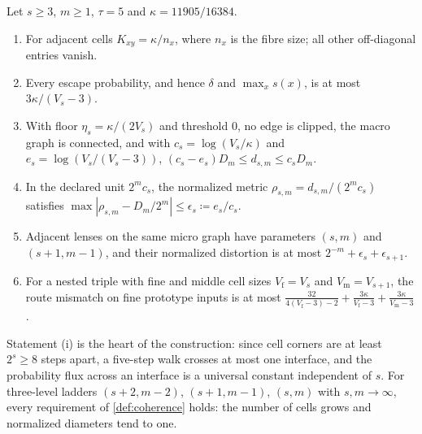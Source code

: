 \begin{theorem}
\label{thm:gasket}
Let $s\ge3$, $m\ge1$, $\tau=5$ and $\kappa=11905/16384$.
\begin{enumerate}[label=(\roman*)]
\item For adjacent cells $K_{xy}=\kappa/n_x$, where $n_x$ is the fibre size; all other off-diagonal entries vanish.
\item Every escape probability, and hence $\delta$ and $\max_x s(x)$, is at most $3\kappa/(V_s-3)$.
\item With floor $\eta_s=\kappa/(2V_s)$ and threshold $0$, no edge is clipped, the macro graph is connected, and with $c_s=\log(V_s/\kappa)$ and $e_s=\log(V_s/(V_s-3))$,
$(c_s-e_s)D_m\le d_{s,m}\le c_sD_m$.
\item In the declared unit $2^mc_s$, the normalized metric $\rho_{s,m}=d_{s,m}/(2^mc_s)$ satisfies $\max|\rho_{s,m}-D_m/2^m|\le\epsilon_s\coloneqq e_s/c_s$.
\item Adjacent lenses on the same micro graph have parameters $(s,m)$ and $(s+1,m-1)$, and their normalized distortion is at most $2^{-m}+\epsilon_s+\epsilon_{s+1}$.
\item For a nested triple with fine and middle cell sizes $V_{\mathrm f}=V_s$ and $V_{\mathrm m}=V_{s+1}$, the route mismatch on fine prototype inputs is at most $\frac{32}{4(V_{\mathrm f}-3)-2}+\frac{3\kappa}{V_{\mathrm f}-3}+\frac{3\kappa}{V_{\mathrm m}-3}$.
\end{enumerate}
\end{theorem}


Statement (i) is the heart of the construction: since cell corners are at least $2^s\ge8$ steps apart, a five-step walk crosses at most one interface, and the probability flux across an interface is a universal constant independent of $s$.
For three-level ladders $(s+2,m-2)$, $(s+1,m-1)$, $(s,m)$ with $s,m\to\infty$, every requirement of \cref{def:coherence} holds: the number of cells grows and normalized diameters tend to one.

